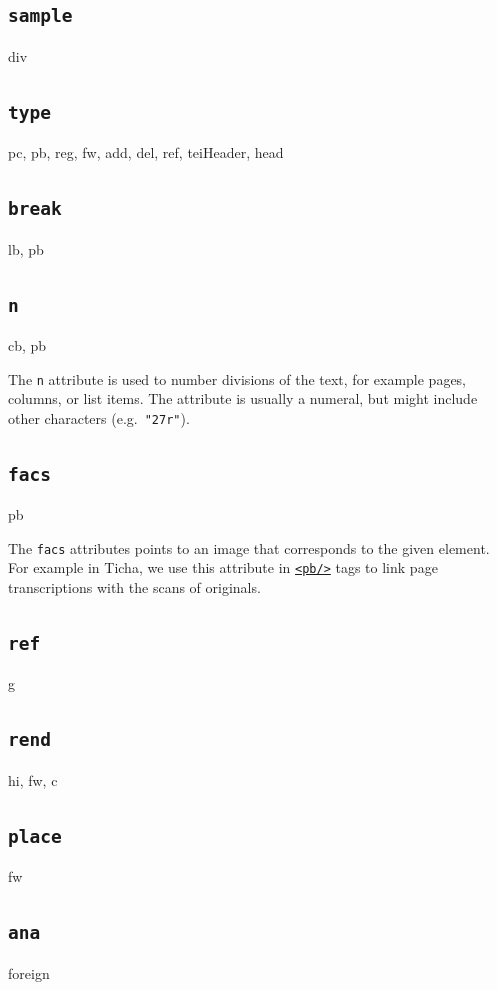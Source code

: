 \documentclass[12pt,a4paper]{article}
\begin{document}
\subsection{\texttt{sample}} \label{att-sec:sample}
div

\subsection{\texttt{type}} \label{att-sec:type}
pc, pb, reg, fw, add, del, ref, teiHeader, head

\subsection{\texttt{break}} \label{att-sec:break}
lb, pb

\subsection{\texttt{n}} \label{att-sec:n}
cb, pb

The \texttt{n} attribute is used to number divisions of the text, for example pages, columns, or list items.  The attribute is usually a numeral, but might include other characters (e.g.\ \texttt{"27r"}).

\subsection{\texttt{facs}} \label{att-sec:facs}
pb

The \texttt{facs} attributes points to an image that corresponds to the given element.  For example in Ticha, we use this attribute in \hyperref[tag-sec:pb]{\texttt{<pb/>}} tags to link page transcriptions with the scans of originals.


\subsection{\texttt{ref}} \label{att-sec:ref}
g

\subsection{\texttt{rend}} \label{att-sec:rend}
hi, fw, c

\subsection{\texttt{place}} \label{att-sec:place}
fw

\subsection{\texttt{ana}} \label{att-sec:ana}
foreign
\end{document}

